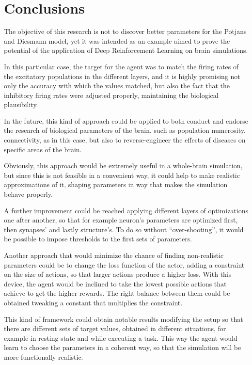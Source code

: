 \section{Conclusions}

The objective of this research is not to discover better parameters for the Potjans and Diesmann model, yet it was intended as an example aimed to prove the potential of the application of Deep Reinforcement Learning on brain simulations.

In this particular case, the target for the agent was to match the firing rates of the excitatory populations in the different layers, and it is highly promising not only the accuracy with which the values matched, but also the fact that the inhibitory firing rates were adjusted properly, maintaining the biological plausibility.

In the future, this kind of approach could be applied to both conduct and endorse the research of biological parameters of the brain, such as population numerosity, connectivity, as in this case, but also to reverse-engineer the effects of diseases on specific areas of the brain.

Obviously, this approach would be extremely useful in a whole-brain simulation, but since this is not feasible in a convenient way, it could help to make realistic approximations of it, shaping parameters in way that makes the simulation behave properly.

A further improvement could be reached applying different layers of optimizations one after another, so that for example neuron's parameters are optimized first, then synapses' and lastly structure's. To do so without ``over-shooting'', it would be possible to impose thresholds to the first sets of parameters.

Another approach that would minimize the chance of finding non-realistic parameters could be to change the loss function of the actor, adding a constraint on the size of actions, so that larger actions produce a higher loss. With this device, the agent would be inclined to take the lowest possible actions that achieve to get the higher rewards. The right balance between them could be obtained tweaking a constant that multiplies the constraint. 

This kind of framework could obtain notable results modifying the setup so that there are different sets of target values, obtained in different situations, for example in resting state and while executing a task. This way the agent would learn to choose the parameters in a coherent way, so that the simulation will be more functionally realistic.

